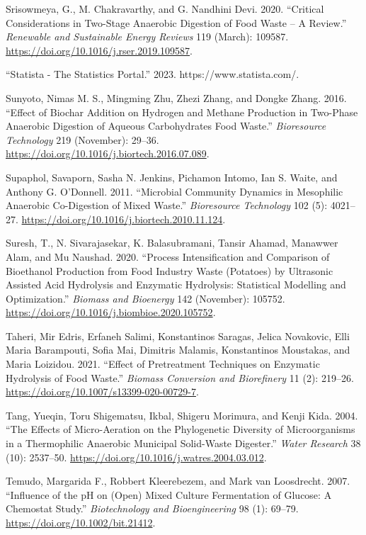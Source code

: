 \documentclass[11pt]{report}
\begin{document}
\begin{hangparas}{1.5em}{1}
\hypertarget{citeproc_bib_item_71}{Srisowmeya, G., M. Chakravarthy, and G. Nandhini Devi. 2020. “Critical Considerations in Two-Stage Anaerobic Digestion of Food Waste – A Review.” \textit{Renewable and Sustainable Energy Reviews} 119 (March): 109587. \url{https://doi.org/10.1016/j.rser.2019.109587}.}

\hypertarget{citeproc_bib_item_72}{“Statista - The Statistics Portal.” 2023. https://www.statista.com/.}

\hypertarget{citeproc_bib_item_73}{Sunyoto, Nimas M. S., Mingming Zhu, Zhezi Zhang, and Dongke Zhang. 2016. “Effect of Biochar Addition on Hydrogen and Methane Production in Two-Phase Anaerobic Digestion of Aqueous Carbohydrates Food Waste.” \textit{Bioresource Technology} 219 (November): 29–36. \url{https://doi.org/10.1016/j.biortech.2016.07.089}.}

\hypertarget{citeproc_bib_item_74}{Supaphol, Savaporn, Sasha N. Jenkins, Pichamon Intomo, Ian S. Waite, and Anthony G. O’Donnell. 2011. “Microbial Community Dynamics in Mesophilic Anaerobic Co-Digestion of Mixed Waste.” \textit{Bioresource Technology} 102 (5): 4021–27. \url{https://doi.org/10.1016/j.biortech.2010.11.124}.}

\hypertarget{citeproc_bib_item_75}{Suresh, T., N. Sivarajasekar, K. Balasubramani, Tansir Ahamad, Manawwer Alam, and Mu Naushad. 2020. “Process Intensification and Comparison of Bioethanol Production from Food Industry Waste (Potatoes) by Ultrasonic Assisted Acid Hydrolysis and Enzymatic Hydrolysis: Statistical Modelling and Optimization.” \textit{Biomass and Bioenergy} 142 (November): 105752. \url{https://doi.org/10.1016/j.biombioe.2020.105752}.}

\hypertarget{citeproc_bib_item_76}{Taheri, Mir Edris, Erfaneh Salimi, Konstantinos Saragas, Jelica Novakovic, Elli Maria Barampouti, Sofia Mai, Dimitris Malamis, Konstantinos Moustakas, and Maria Loizidou. 2021. “Effect of Pretreatment Techniques on Enzymatic Hydrolysis of Food Waste.” \textit{Biomass Conversion and Biorefinery} 11 (2): 219–26. \url{https://doi.org/10.1007/s13399-020-00729-7}.}

\hypertarget{citeproc_bib_item_77}{Tang, Yueqin, Toru Shigematsu, Ikbal, Shigeru Morimura, and Kenji Kida. 2004. “The Effects of Micro-Aeration on the Phylogenetic Diversity of Microorganisms in a Thermophilic Anaerobic Municipal Solid-Waste Digester.” \textit{Water Research} 38 (10): 2537–50. \url{https://doi.org/10.1016/j.watres.2004.03.012}.}

\hypertarget{citeproc_bib_item_78}{Temudo, Margarida F., Robbert Kleerebezem, and Mark van Loosdrecht. 2007. “Influence of the pH on (Open) Mixed Culture Fermentation of Glucose: A Chemostat Study.” \textit{Biotechnology and Bioengineering} 98 (1): 69–79. \url{https://doi.org/10.1002/bit.21412}.}


\end{hangparas}
\end{document}
